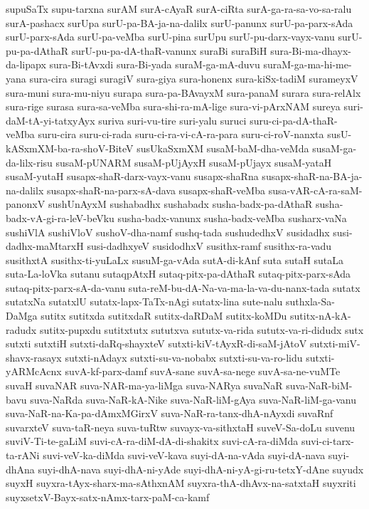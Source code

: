 {supuSaTx
supu-tarxna
surAM
surA-cAyaR
surA-ciRta
surA-ga-ra-sa-vo-sa-ralu
surA-pashacx
surUpa
surU-pa-BA-ja-na-dalilx
surU-panunx
surU-pa-parx-sAda
surU-parx-sAda
surU-pa-veMba
surU-pina
surUpu
surU-pu-darx-vayx-vanu
surU-pu-pa-dAthaR
surU-pu-pa-dA-thaR-vanunx
suraBi
suraBiH
sura-Bi-ma-dhayx-da-lipapx
sura-Bi-tAvxdi
sura-Bi-yada
suraM-ga-mA-duvu
suraM-ga-ma-hi-me-yana
sura-cira
suragi
suragiV
sura-giya
sura-honenx
sura-kiSx-tadiM
surameyxV
sura-muni
sura-mu-niyu
surapa
sura-pa-BAvayxM
sura-panaM
surara
sura-relAlx
sura-rige
surasa
sura-sa-veMba
sura-shi-ra-mA-lige
sura-vi-pArxNAM
sureya
suri-daM-tA-yi-tatxyAyx
suriva
suri-vu-tire
suri-yalu
suruci
suru-ci-pa-dA-thaR-veMba
suru-cira
suru-ci-rada
suru-ci-ra-vi-cA-ra-para
suru-ci-roV-nanxta
susU-kASxmXM-ba-ra-shoV-BiteV
susUkaSxmXM
susaM-baM-dha-veMda
susaM-ga-da-lilx-risu
susaM-pUNARM
susaM-pUjAyxH
susaM-pUjayx
susaM-yataH
susaM-yutaH
susapx-shaR-darx-vayx-vanu
susapx-shaRna
susapx-shaR-na-BA-ja-na-dalilx
susapx-shaR-na-parx-sA-dava
susapx-shaR-veMba
susa-vAR-cA-ra-saM-panonxV
sushUnAyxM
sushabadhx
sushabadx
susha-badx-pa-dAthaR
susha-badx-vA-gi-ra-leV-beVku
susha-badx-vanunx
susha-badx-veMba
susharx-vaNa
sushiVlA
sushiVloV
sushoV-dha-namf
sushq-tada
sushudedhxV
susidadhx
susi-dadhx-maMtarxH
susi-dadhxyeV
susidodhxV
susithx-ramf
susithx-ra-vadu
susithxtA
susithx-ti-yuLaLx
susuM-ga-vAda
sutA-di-kAnf
suta
sutaH
sutaLa
suta-La-loVka
sutanu
sutaqpAtxH
sutaq-pitx-pa-dAthaR
sutaq-pitx-parx-sAda
sutaq-pitx-parx-sA-da-vanu
suta-reM-bu-dA-Na-va-ma-la-va-du-nanx-tada
sutatx
sutatxNa
sutatxlU
sutatx-lapx-TaTx-nAgi
sutatx-lina
sute-nalu
suthxla-Sa-DaMga
sutitx
sutitxda
sutitxdaR
sutitx-daRDaM
sutitx-koMDu
sutitx-nA-kA-radudx
sutitx-pupxdu
sutitxtutx
sututxva
sututx-va-rida
sututx-va-ri-didudx
sutx
sutxti
sutxtiH
sutxti-daRq-shayxteV
sutxti-kiV-tAyxR-di-saM-jAtoV
sutxti-miV-shavx-rasayx
sutxti-nAdayx
sutxti-su-va-nobabx
sutxti-su-va-ro-lidu
sutxti-yARMcAcnx
suvA-kf-parx-damf
suvA-sane
suvA-sa-nege
suvA-sa-ne-vuMTe
suvaH
suvaNAR
suva-NAR-ma-ya-liMga
suva-NARya
suvaNaR
suva-NaR-biM-bavu
suva-NaRda
suva-NaR-kA-Nike
suva-NaR-liM-gAya
suva-NaR-liM-ga-vanu
suva-NaR-na-Ka-pa-dAmxMGirxV
suva-NaR-ra-tanx-dhA-nAyxdi
suvaRnf
suvarxteV
suva-taR-neya
suva-tuRtw
suvayx-va-sithxtaH
suveV-Sa-doLu
suvenu
suviV-Ti-te-gaLiM
suvi-cA-ra-diM-dA-di-shakitx
suvi-cA-ra-diMda
suvi-ci-tarx-ta-rANi
suvi-veV-ka-diMda
suvi-veV-kava
suyi-dA-na-vAda
suyi-dA-nava
suyi-dhAna
suyi-dhA-nava
suyi-dhA-ni-yAde
suyi-dhA-ni-yA-gi-ru-tetxY-dAne
suyudx
suyxH
suyxra-tAyx-sharx-ma-sAthxnAM
suyxra-thA-dhAvx-na-satxtaH
suyxriti
suyxsetxV-Bayx-satx-nAmx-tarx-paM-ca-kamf
}
